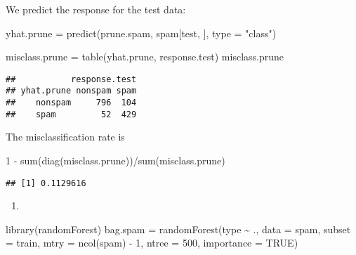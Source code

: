 \documentclass[
]{article}
\newenvironment{Shaded}{\begin{snugshade}}{\end{snugshade}}
\newcommand{\AttributeTok}[1]{\textcolor[rgb]{0.77,0.63,0.00}{#1}}
\newcommand{\ConstantTok}[1]{\textcolor[rgb]{0.00,0.00,0.00}{#1}}
\newcommand{\DecValTok}[1]{\textcolor[rgb]{0.00,0.00,0.81}{#1}}
\newcommand{\FunctionTok}[1]{\textcolor[rgb]{0.00,0.00,0.00}{#1}}
\newcommand{\NormalTok}[1]{#1}
\newcommand{\OtherTok}[1]{\textcolor[rgb]{0.56,0.35,0.01}{#1}}
\newcommand{\SpecialCharTok}[1]{\textcolor[rgb]{0.00,0.00,0.00}{#1}}
\newcommand{\StringTok}[1]{\textcolor[rgb]{0.31,0.60,0.02}{#1}}
\providecommand{\tightlist}{%
  \setlength{\itemsep}{0pt}\setlength{\parskip}{0pt}}
\begin{document}
We predict the response for the test data:

\begin{Shaded}
\begin{Highlighting}[]
\NormalTok{yhat.prune }\OtherTok{=} \FunctionTok{predict}\NormalTok{(prune.spam, spam[test, ], }\AttributeTok{type =} \StringTok{"class"}\NormalTok{)}

\NormalTok{misclass.prune }\OtherTok{=} \FunctionTok{table}\NormalTok{(yhat.prune, response.test)}
\NormalTok{misclass.prune}
\end{Highlighting}
\end{Shaded}

\begin{verbatim}
##           response.test
## yhat.prune nonspam spam
##    nonspam     796  104
##    spam         52  429
\end{verbatim}

The misclassification rate is

\begin{Shaded}
\begin{Highlighting}[]
\DecValTok{1} \SpecialCharTok{{-}} \FunctionTok{sum}\NormalTok{(}\FunctionTok{diag}\NormalTok{(misclass.prune))}\SpecialCharTok{/}\FunctionTok{sum}\NormalTok{(misclass.prune)}
\end{Highlighting}
\end{Shaded}

\begin{verbatim}
## [1] 0.1129616
\end{verbatim}

\begin{enumerate}
\def\labelenumi{\alph{enumi})}
\setcounter{enumi}{5}
\tightlist
\item
\end{enumerate}

\begin{Shaded}
\begin{Highlighting}[]
\FunctionTok{library}\NormalTok{(randomForest)}
\NormalTok{bag.spam }\OtherTok{=} \FunctionTok{randomForest}\NormalTok{(type }\SpecialCharTok{\textasciitilde{}}\NormalTok{ ., }\AttributeTok{data =}\NormalTok{ spam, }\AttributeTok{subset =}\NormalTok{ train, }\AttributeTok{mtry =} \FunctionTok{ncol}\NormalTok{(spam) }\SpecialCharTok{{-}}
    \DecValTok{1}\NormalTok{, }\AttributeTok{ntree =} \DecValTok{500}\NormalTok{, }\AttributeTok{importance =} \ConstantTok{TRUE}\NormalTok{)}
\end{Highlighting}
\end{Shaded}
\end{document}
